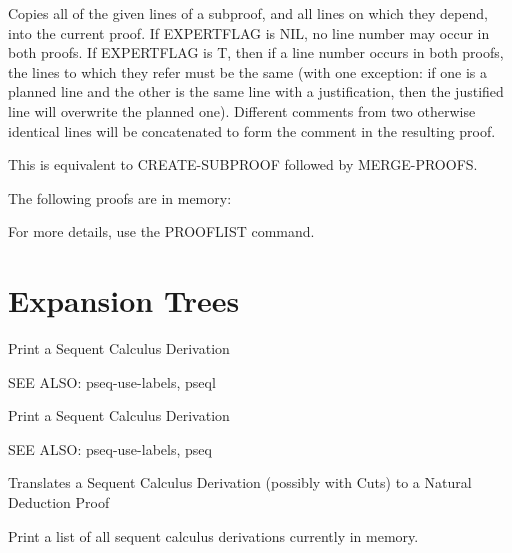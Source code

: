 \begin{description}
\item[\parbox{\textwidth}{TRANSFER-LINES \textit{proof} \textit{subproof} \textit{lines}}]  
Copies all of the given lines of a subproof, and
all lines on which they depend, into the current proof. 
If EXPERTFLAG is NIL, no line number may occur in both proofs.
If EXPERTFLAG is T, then if a line number occurs in both proofs, the 
lines to which they refer must be the same (with one exception: if 
one is a planned line and the other is the same line with a 
justification, then the justified line will overwrite the planned one).
Different comments from two otherwise identical lines will be 
concatenated to form the comment in the resulting proof.

This is equivalent to CREATE-SUBPROOF followed by MERGE-PROOFS.

The following proofs are in memory:

For more details, use the PROOFLIST command.


\item
\end{description}

\section{Expansion Trees}

\begin{description} 
\item[\parbox{\textwidth}{PSEQ \textit{prefix}}]  
Print a Sequent Calculus Derivation

SEE ALSO: pseq-use-labels, pseql

\item[\parbox{\textwidth}{PSEQL \textit{prefix} \textit{lbd} \textit{ubd}}]  
Print a Sequent Calculus Derivation

SEE ALSO: pseq-use-labels, pseq

\item[\parbox{\textwidth}{SEQ-TO-NAT \textit{sname} \textit{prefix}}]  
Translates a Sequent Calculus Derivation (possibly with Cuts)
to a Natural Deduction Proof

\item[\parbox{\textwidth}{SEQLIST}]  
Print a list of all sequent calculus derivations currently in memory.
\item
\end{description}

